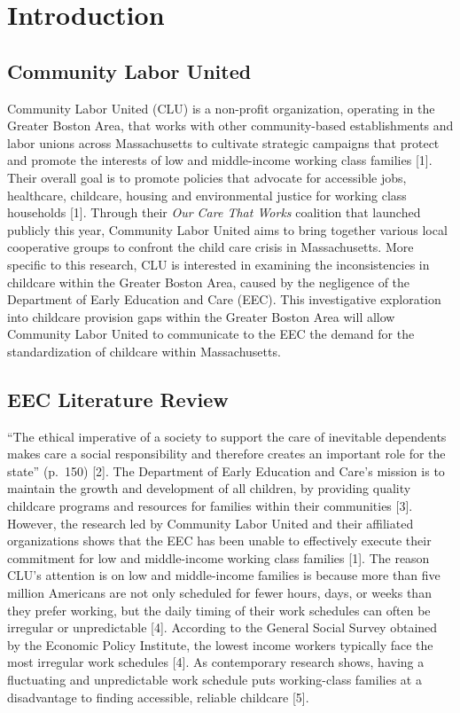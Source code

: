 \documentclass[10pt,letterpaper]{article}
\begin{document}
\linenumbers

\section{Introduction}\label{introduction}

\subsection{Community Labor United}\label{community-labor-united}

Community Labor United (CLU) is a non-profit organization, operating in
the Greater Boston Area, that works with other community-based
establishments and labor unions across Massachusetts to cultivate
strategic campaigns that protect and promote the interests of low and
middle-income working class families {[}1{]}. Their overall goal is to
promote policies that advocate for accessible jobs, healthcare,
childcare, housing and environmental justice for working class
households {[}1{]}. Through their \emph{Our Care That Works} coalition
that launched publicly this year, Community Labor United aims to bring
together various local cooperative groups to confront the child care
crisis in Massachusetts. More specific to this research, CLU is
interested in examining the inconsistencies in childcare within the
Greater Boston Area, caused by the negligence of the Department of Early
Education and Care (EEC). This investigative exploration into childcare
provision gaps within the Greater Boston Area will allow Community Labor
United to communicate to the EEC the demand for the standardization of
childcare within Massachusetts.

\subsection{EEC Literature Review}\label{eec-literature-review}

``The ethical imperative of a society to support the care of inevitable
dependents makes care a social responsibility and therefore creates an
important role for the state'' (p.~150) {[}2{]}. The Department of Early
Education and Care's mission is to maintain the growth and development
of all children, by providing quality childcare programs and resources
for families within their communities {[}3{]}. However, the research led
by Community Labor United and their affiliated organizations shows that
the EEC has been unable to effectively execute their commitment for low
and middle-income working class families {[}1{]}. The reason CLU's
attention is on low and middle-income families is because more than five
million Americans are not only scheduled for fewer hours, days, or weeks
than they prefer working, but the daily timing of their work schedules
can often be irregular or unpredictable {[}4{]}. According to the
General Social Survey obtained by the Economic Policy Institute, the
lowest income workers typically face the most irregular work schedules
{[}4{]}. As contemporary research shows, having a fluctuating and
unpredictable work schedule puts working-class families at a
disadvantage to finding accessible, reliable childcare {[}5{]}.
\end{document}
